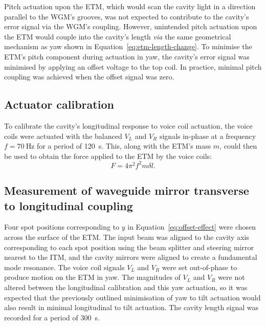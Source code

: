 Pitch actuation upon the \gls{ETM}, which would scan the cavity light in a direction parallel to the \gls{WGM}'s grooves, was not expected to contribute to the cavity's error signal via the \gls{WGM}'s coupling. However, unintended pitch actuation upon the \gls{ETM} would couple into the cavity's length \emph{via} the same geometrical mechanism as yaw shown in Equation~\ref{eq:etm-length-change}. To minimise the \gls{ETM}'s pitch component during actuation in yaw, the cavity's error signal was minimised by applying an offset voltage to the top coil. In practice, minimal pitch coupling was achieved when the offset signal was zero.

\subsection{Actuator calibration}

To calibrate the cavity's longitudinal response to voice coil actuation, the voice coils were actuated with the balanced $V_L$ and $V_R$ signals in-phase at a frequency $f = \SI{70}{\hertz}$ for a period of \SI{120}{\second}. This, along with the \gls{ETM}'s mass $m$, could then be used to obtain the force applied to the \gls{ETM} by the voice coils:
\begin{equation}
  F = 4 \pi^2 f^2 m \delta l.
  \label{eq:force-calibration}
\end{equation}

\subsection{Measurement of waveguide mirror transverse to longitudinal coupling}
\label{sec:length-changes}


Four spot positions corresponding to $y$ in Equation~\ref{eq:offset-effect} were chosen across the surface of the \gls{ETM}. The input beam was aligned to the cavity axis corresponding to each spot position using the beam splitter and steering mirror nearest to the \gls{ITM}, and the cavity mirrors were aligned to create a fundamental mode resonance. The voice coil signals $V_L$ and $V_R$ were set out-of-phase to produce motion on the \gls{ETM} in yaw. The magnitudes of $V_L$ and $V_R$ were not altered between the longitudinal calibration and this yaw actuation, so it was expected that the previously outlined minimisation of yaw to tilt actuation would also result in minimal longitudinal to tilt actuation. The cavity length signal was recorded for a period of \SI{300}{\second}.

